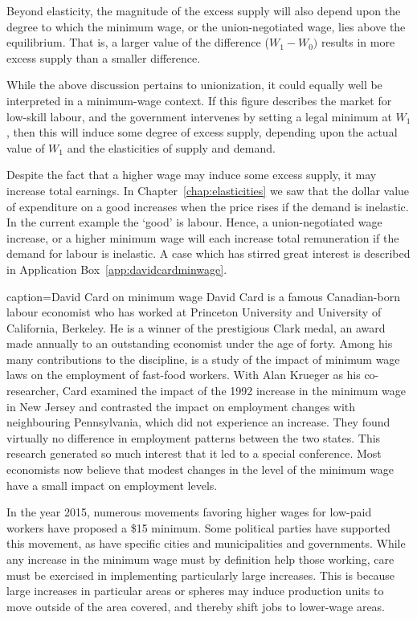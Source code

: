 

\newhtmlpage

Beyond elasticity, the magnitude of the excess supply will also depend upon
the degree to which the minimum wage, or the union-negotiated wage, lies
above the equilibrium. That is, a larger value of the difference ($W_{1}-W_{0})$ 
results in more excess supply than a smaller difference. 

While the above discussion pertains to unionization, it could equally well
be interpreted in a minimum-wage context. If this figure describes the
market for low-skill labour, and the government intervenes by setting a
legal minimum at $W_{1}$, then this will induce some degree of excess
supply, depending upon the actual value of $W_{1}$ and the elasticities of
supply and demand. 

Despite the fact that a higher wage may induce some excess supply, it may
increase total earnings. In Chapter~\ref{chap:elasticities} we saw that the
dollar value of expenditure on a good increases when the price rises if the
demand is inelastic. In the current example the `good' is labour. Hence, a
union-negotiated wage increase, or a higher minimum wage will each increase
total remuneration if the demand for labour is inelastic. A case which has
stirred great interest is described in Application Box~\ref{app:davidcardminwage}.

\newpage

\begin{ApplicationBox}{caption={David Card on minimum wage \label{app:davidcardminwage}}}
David Card is a famous Canadian-born labour economist who has worked at Princeton University and University of California, Berkeley. He is a winner of the prestigious Clark medal, an award made annually to an outstanding economist under the age of forty. Among his many contributions to the discipline, is a study of the impact of minimum wage laws on the employment of fast-food workers. With Alan Krueger as his co-researcher, Card examined the impact of the 1992 increase in the minimum wage in New Jersey and contrasted the impact on employment changes with neighbouring Pennsylvania, which did not experience an increase. They found virtually no difference in employment patterns between the two states. This research generated so much interest that it led to a special conference. Most economists now believe that modest changes in the level of the minimum wage have a small impact on employment levels.

In the year 2015, numerous movements favoring higher wages for low-paid workers have proposed a \$15 minimum. Some political parties have supported this movement, as have specific cities and municipalities and governments. While any increase in the minimum wage must by definition help those working, care must be exercised in implementing particularly large increases. This is because large increases in particular areas or spheres may induce production units to move outside of the area covered, and thereby shift jobs to lower-wage areas.
\end{ApplicationBox}
